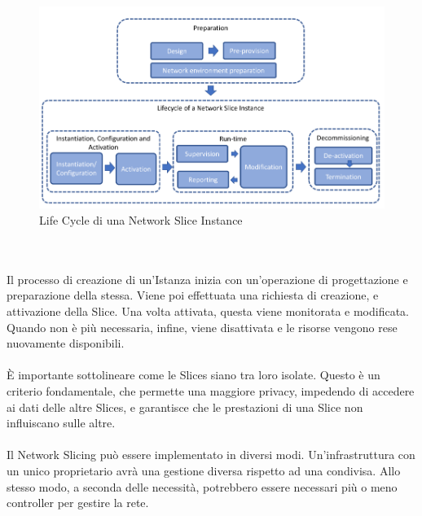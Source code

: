 \begin{figure}
	\centering
	\includegraphics[width=1\linewidth]{../immagini/nslc}
	\caption[Network Slice life cycle]{Life Cycle di una Network Slice Instance}
	\label{fig:nslc}
\end{figure}\\\\
Il processo di creazione di un'Istanza inizia con un'operazione di progettazione e preparazione della stessa. Viene poi effettuata una richiesta di creazione, e attivazione della Slice. Una volta attivata, questa viene monitorata e modificata. Quando non è più necessaria, infine, viene disattivata e le risorse vengono rese nuovamente disponibili.\\\\
È importante sottolineare come le Slices siano tra loro isolate. Questo è un criterio fondamentale, che permette una maggiore privacy, impedendo di accedere ai dati delle altre Slices, e garantisce che le prestazioni di una Slice non influiscano sulle altre.\\\\
Il Network Slicing può essere implementato  in diversi modi. Un'infrastruttura con un unico proprietario avrà una gestione diversa rispetto ad una condivisa. Allo stesso modo, a seconda delle necessità, potrebbero essere necessari più o meno controller per gestire la rete.
